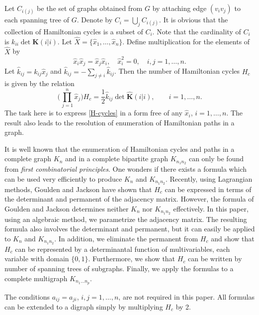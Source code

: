 \documentclass{article}
\begin{document}
\newcommand{\abs}[1]{\left\lvert#1\right\rvert}
\newcommand{\wh}{\widehat}
Let $C_{i(j)}$ be the set of graphs obtained from $G$ by attaching edge
$(v_iv_j)$ to each spanning tree of $G$. Denote by $C_i=\bigcup_j
C_{i(j)}$. It is obvious that the collection of Hamiltonian cycles is a
subset of $C_i$. Note that the cardinality of $C_i$ is $k_{ii}\det
\mathbf{K}(i|i)$. Let $\wh X=\{\hat x_1,\dots,\hat x_n\}$.  Define multiplication for the elements of $\wh X$ by
\begin{equation}\label{multdef}
\hat x_i\hat x_j=\hat x_j\hat x_i,\quad \hat x^2_i=0,\quad
i,j=1,\dots,n.
\end{equation}
Let $\hat k_{ij}=k_{ij}\hat x_j$ and $\hat k_{ij}=-\sum_{j\not=i} \hat
k_{ij}$. Then the number of Hamiltonian cycles $H_c$ is given by the
relation
\begin{equation}\label{H-cycles}
\biggl(\prod^n_{\,j=1}\hat x_j\biggr)H_c=\frac{1}{2}\hat k_{ij}\det
\wh{\mathbf{K}}(i|i),\qquad i=1,\dots,n.
\end{equation}
The task here is to express \eqref{H-cycles}
in a form free of any $\hat x_i$,
$i=1,\dots,n$. The result also leads to the resolution of enumeration of
Hamiltonian paths in a graph.

It is well known that the enumeration of Hamiltonian cycles and paths
in a complete graph $K_n$ and in a complete bipartite graph
$K_{n_1n_2}$ can only be found from \textit{first combinatorial
  principles}. One wonders if there exists a formula which can be used
very efficiently to produce $K_n$ and $K_{n_1n_2}$. Recently, using
Lagrangian methods, Goulden and Jackson have shown that $H_c$ can be
expressed in terms of the determinant and permanent of the adjacency
matrix. However, the formula of Goulden and
Jackson determines neither $K_n$ nor $K_{n_1n_2}$ effectively. In this
paper, using an algebraic method, we parametrize the adjacency matrix.
The resulting formula also involves the determinant and permanent, but
it can easily be applied to $K_n$ and $K_{n_1n_2}$. In addition, we
eliminate the permanent from $H_c$ and show that $H_c$ can be
represented by a determinantal function of multivariables, each
variable with domain $\{0,1\}$. Furthermore, we show that $H_c$ can be
written by number of spanning trees of subgraphs. Finally, we apply
the formulas to a complete multigraph $K_{n_1\dots n_p}$.

The conditions $a_{ij}=a_{ji}$, $i,j=1,\dots,n$, are not required in
this paper. All formulas can be extended to a digraph simply by
multiplying $H_c$ by 2.
\end{document}
